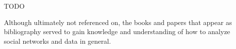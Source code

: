 TODO

Although ultimately not referenced on, the books and papers that appear as bibliography served to gain knowledge and understanding of how to analyze social networks and data in general.